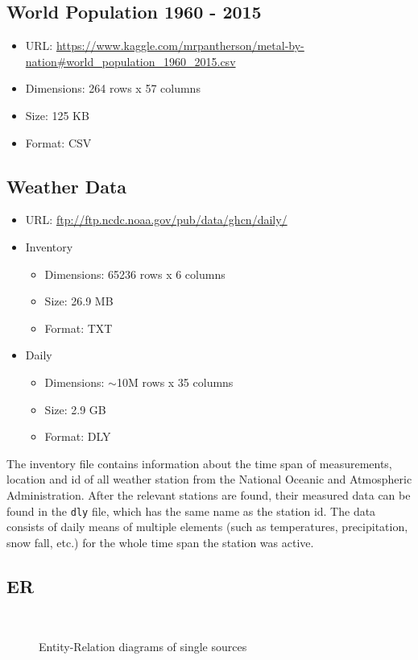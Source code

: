\subsection{World Population 1960 - 2015}
\begin{itemize}
	\item URL: \url{https://www.kaggle.com/mrpantherson/metal-by-nation#world_population_1960_2015.csv}
	\item Dimensions: 264 rows x 57 columns
	\item Size: 125 KB
	\item Format: CSV
\end{itemize}

\subsection{Weather Data}
\begin{itemize}
	\item URL: \url{ftp://ftp.ncdc.noaa.gov/pub/data/ghcn/daily/}
	\item Inventory
	\begin{itemize}
	  \item Dimensions: 65236 rows x 6 columns
	  \item Size: 26.9 MB
	  \item Format: TXT
    \end{itemize}
	\item Daily
	\begin{itemize}
	  \item Dimensions: $\sim$10M rows x 35 columns
	  \item Size: 2.9 GB
	  \item Format: DLY
    \end{itemize}
\end{itemize}

The inventory file contains information about the time span of measurements, location and id of all weather station from the National Oceanic and Atmospheric Administration. After the relevant stations are found, their measured data can be found in the \texttt{dly} file, which has the same name as the station id. The data consists of daily means of multiple elements (such as temperatures, precipitation, snow fall, etc.) for the whole time span the station was active.

\subsection{ER}
\begin{figure}[hbt!]
    \qquad
    \qquad
    \centering
    \qquad\\
    \centering
    \qquad
    \caption{Entity-Relation diagrams of single sources}
\label{fig:example subfigure}
\end{figure}




